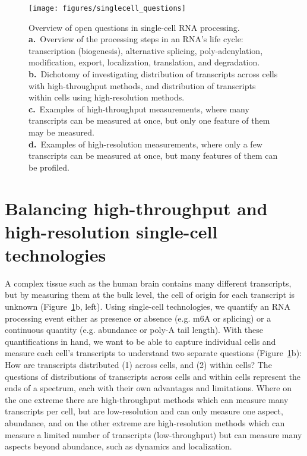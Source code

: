 \begin{figure}
  \centering
  \texttt{[image: figures/singlecell\_questions]}
  \caption[Overview of open questions in single-cell RNA processing.]{Overview of open questions in single-cell RNA processing.\\
\textbf{a.}~Overview of the processing steps in an RNA’s life cycle: transcription (biogenesis), alternative splicing, poly-adenylation, modification, export, localization, translation, and degradation.\\
\textbf{b.}~Dichotomy of investigating distribution of transcripts across cells with high-throughput methods, and distribution of transcripts within cells using high-resolution methods.\\
\textbf{c.}~Examples of high-throughput measurements, where many transcripts can be measured at once, but only one feature of them may be measured.\\
\textbf{d.}~Examples of high-resolution measurements, where only a few transcripts can be measured at once, but many features of them can be profiled.}
\label{fig:singlecell_questions}
\end{figure}

\section{Balancing high-throughput and high-resolution single-cell technologies}

A complex tissue such as the human brain contains many different transcripts, but by measuring them at the bulk level, the cell of origin for each transcript is unknown (Figure~\ref{fig:singlecell_questions}b, left). Using single-cell technologies, we quantify an RNA processing event either as presence or absence (e.g. m6A or splicing) or a continuous quantity (e.g. abundance or poly-A tail length). With these quantifications in hand, we want to be able to capture individual cells and measure each cell's transcripts to understand two separate questions (Figure~\ref{fig:singlecell_questions}b): How are transcripts distributed (1) across cells, and (2) within cells?
	The questions of distributions of transcripts across cells and within cells represent the ends of a spectrum, each with their own advantages and limitations. Where on the one extreme there are high-throughput methods which can measure many transcripts per cell, but are low-resolution and can only measure one aspect, abundance, and on the other extreme are high-resolution methods which can measure a limited number of transcripts (low-throughput) but can measure many aspects beyond abundance, such as dynamics and localization.
	


